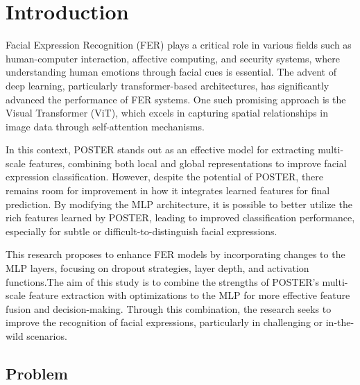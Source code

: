 \chapter{Introduction}
\label{chapter:introduction}
%
%



Facial Expression Recognition (FER) plays a critical role in various fields such as human-computer interaction, affective computing, and security systems, where understanding human emotions through facial cues is essential. The advent of deep learning, particularly transformer-based architectures, has significantly advanced the performance of FER systems. One such promising approach is the Visual Transformer (ViT), which excels in capturing spatial relationships in image data through self-attention mechanisms.

In this context, \gls{POSTER} \cite{zheng_poster_2022} stands out as an effective model for extracting multi-scale features, combining both local and global representations to improve facial expression classification. However, despite the potential of \gls{POSTER}, there remains room for improvement in how it integrates learned features for final prediction. By modifying the MLP architecture, it is possible to better utilize the rich features learned by \gls{POSTER}, leading to improved classification performance, especially for subtle or difficult-to-distinguish facial expressions. 


This research proposes to enhance FER models by incorporating changes to the MLP layers, focusing on dropout strategies, layer depth, and activation functions.The aim of this study is to combine the strengths of \gls{POSTER}’s multi-scale feature extraction with optimizations to the MLP for more effective feature fusion and decision-making. Through this combination, the research seeks to improve the recognition of facial expressions, particularly in challenging or \gls{in-the-wild} scenarios. 

\newpage

\section{Problem}


%


